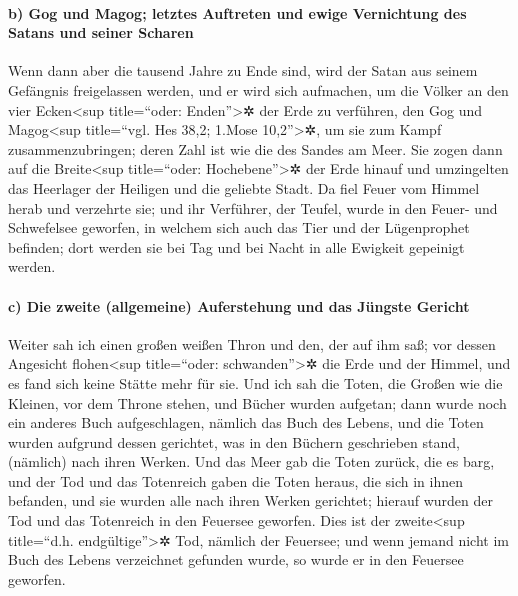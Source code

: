 \hypertarget{b-gog-und-magog-letztes-auftreten-und-ewige-vernichtung-des-satans-und-seiner-scharen}{%
\paragraph{b) Gog und Magog; letztes Auftreten und ewige Vernichtung des
Satans und seiner
Scharen}\label{b-gog-und-magog-letztes-auftreten-und-ewige-vernichtung-des-satans-und-seiner-scharen}}

 Wenn dann aber die tausend Jahre zu Ende sind, wird der
Satan aus seinem Gefängnis freigelassen werden,  und er
wird sich aufmachen, um die Völker an den vier Ecken\textless sup
title=``oder: Enden''\textgreater✲ der Erde zu verführen, den Gog und
Magog\textless sup title=``vgl. Hes 38,2; 1.Mose 10,2''\textgreater✲, um
sie zum Kampf zusammenzubringen; deren Zahl ist wie die des Sandes am
Meer.  Sie zogen dann auf die Breite\textless sup
title=``oder: Hochebene''\textgreater✲ der Erde hinauf und umzingelten
das Heerlager der Heiligen und die geliebte Stadt. Da fiel Feuer vom
Himmel herab und verzehrte sie;  und ihr Verführer, der
Teufel, wurde in den Feuer- und Schwefelsee geworfen, in welchem sich
auch das Tier und der Lügenprophet befinden; dort werden sie bei Tag und
bei Nacht in alle Ewigkeit gepeinigt werden.

\hypertarget{c-die-zweite-allgemeine-auferstehung-und-das-juxfcngste-gericht}{%
\paragraph{c) Die zweite (allgemeine) Auferstehung und das Jüngste
Gericht}\label{c-die-zweite-allgemeine-auferstehung-und-das-juxfcngste-gericht}}

 Weiter sah ich einen großen weißen Thron und den, der
auf ihm saß; vor dessen Angesicht flohen\textless sup title=``oder:
schwanden''\textgreater✲ die Erde und der Himmel, und es fand sich keine
Stätte mehr für sie.  Und ich sah die Toten, die Großen
wie die Kleinen, vor dem Throne stehen, und Bücher wurden aufgetan; dann
wurde noch ein anderes Buch aufgeschlagen, nämlich das Buch des Lebens,
und die Toten wurden aufgrund dessen gerichtet, was in den Büchern
geschrieben stand, (nämlich) nach ihren Werken.  Und das
Meer gab die Toten zurück, die es barg, und der Tod und das Totenreich
gaben die Toten heraus, die sich in ihnen befanden, und sie wurden alle
nach ihren Werken gerichtet;  hierauf wurden der Tod und
das Totenreich in den Feuersee geworfen. Dies ist der
zweite\textless sup title=``d.h. endgültige''\textgreater✲ Tod, nämlich
der Feuersee;  und wenn jemand nicht im Buch des Lebens
verzeichnet gefunden wurde, so wurde er in den Feuersee geworfen.

